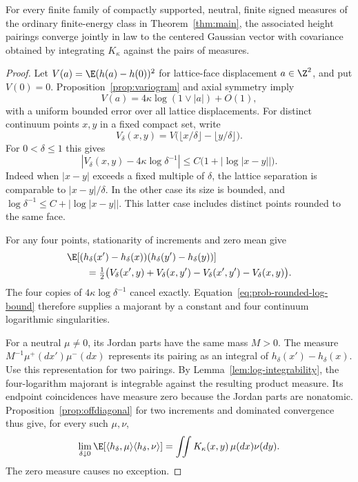 \begin{proposition}\label{prop:finite-energy}
For every finite family of compactly supported, neutral, finite signed
measures of the ordinary finite-energy class in
Theorem~\ref{thm:main}, the associated height pairings converge jointly
in law to the centered Gaussian vector with covariance obtained by
integrating \(K_\kappa\) against the pairs of measures.
\end{proposition}

\begin{proof}
Let \(V(a)=\E(h(a)-h(0))^2\) for lattice-face displacement
\(a\in\Z^2\), and put \(V(0)=0\).
Proposition~\ref{prop:variogram} and axial symmetry imply
\[
 V(a)=4\kappa\log(1\vee|a|)+O(1),
\]
with a uniform bounded error over all lattice displacements.
For distinct continuum points \(x,y\) in a fixed compact set, write
\[
 V_\delta(x,y)=
 V\bigl(\lfloor x/\delta\rfloor-\lfloor y/\delta\rfloor\bigr).
\]
For \(0<\delta\le1\) this gives
\begin{equation}\label{eq:prob-rounded-log-bound}
 \left|V_\delta(x,y)-4\kappa\log\delta^{-1}\right|
       \le C\bigl(1+|\log|x-y||\bigr).
\end{equation}
Indeed when \(|x-y|\) exceeds a fixed multiple of \(\delta\), the
lattice separation is comparable to \(|x-y|/\delta\).
In the other case its size is bounded, and
\(\log\delta^{-1}\le C+|\log|x-y||\).
This latter case includes distinct points rounded to the same face.

For any four points, stationarity of increments and zero mean give
\begin{align}\label{eq:prob-four-variograms}
 &\E[(h_\delta(x')-h_\delta(x))
            (h_\delta(y')-h_\delta(y))]\\
 &\qquad=\tfrac12\bigl(
 V_\delta(x',y)+V_\delta(x,y')
       -V_\delta(x',y')-V_\delta(x,y)\bigr).\nonumber
\end{align}
The four copies of \(4\kappa\log\delta^{-1}\) cancel exactly.
Equation~\eqref{eq:prob-rounded-log-bound} therefore supplies a majorant
by a constant and four continuum logarithmic singularities.

For a neutral \(\mu\ne0\), its Jordan parts have the same mass
\(M>0\). The measure
\(M^{-1}\mu^+(dx')\mu^-(dx)\) represents its pairing as an integral
of \(h_\delta(x')-h_\delta(x)\).
Use this representation for two pairings. By
Lemma~\ref{lem:log-integrability}, the four-logarithm majorant is
integrable against the resulting product measure. Its endpoint
coincidences have measure zero because the Jordan parts are nonatomic.
Proposition~\ref{prop:offdiagonal} for two increments and dominated
convergence thus give, for every such \(\mu,\nu\),
\begin{equation}\label{eq:prob-energy-covariance}
 \lim_{\delta\downarrow0}
       \E[\langle h_\delta,\mu\rangle
                  \langle h_\delta,\nu\rangle]
     =\iint K_\kappa(x,y)\,\mu(dx)\nu(dy).
\end{equation}
The zero measure causes no exception.


\end{proof}
